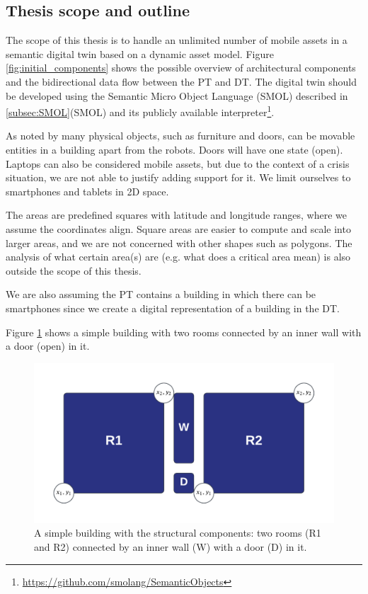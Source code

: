 \documentclass{article}
\begin{document}
\subsection{Thesis scope and outline}\label{subsec:Scope}
The scope of this thesis is to handle an unlimited number of mobile assets in a semantic digital twin based on a dynamic asset model. Figure \ref{fig:initial_components} shows the possible overview of architectural components and the bidirectional data flow between the PT and DT. The digital twin should be developed using the Semantic Micro Object Language (SMOL) described in \ref{subsec:SMOL}(SMOL) and its publicly available interpreter\footnote{\url{https://github.com/smolang/SemanticObjects}}.

As noted by \citeauthor{pauwels_live_2023} many physical objects, such as furniture and doors, can be movable entities in a building apart from the robots. Doors will have one state (open). Laptops can also be considered mobile assets, but due to the context of a crisis situation, we are not able to justify adding support for it. We limit ourselves to smartphones and tablets in 2D space.  

The areas are predefined squares with latitude and longitude ranges, where we assume the coordinates align. Square areas are easier to compute and scale into larger areas, and we are not concerned with other shapes such as polygons. The analysis of what certain area(s) are (e.g. what does a critical area mean) is also outside the scope of this thesis.

We are also assuming the PT contains a building in which there can be smartphones since we create a digital representation of a building in the DT.

Figure \ref{fig:simple_building} shows a simple building with two rooms connected by an inner wall with a door (open) in it.

\begin{figure}[H]
    \centering
    \includegraphics[scale=0.3]{graphics/simple_building.png}
    \caption{A simple building with the structural components: two rooms (R1 and R2) connected by an inner wall (W) with a door (D) in it.}
    \label{fig:simple_building}
\end{figure}
\end{document}
